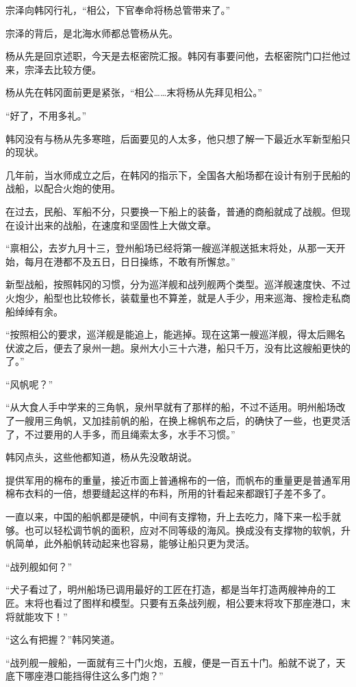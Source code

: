 宗泽向韩冈行礼，“相公，下官奉命将杨总管带来了。”

宗泽的背后，是北海水师都总管杨从先。

杨从先是回京述职，今天是去枢密院汇报。韩冈有事要问他，去枢密院门口拦他过来，宗泽去比较方便。

杨从先在韩冈面前更是紧张，“相公……末将杨从先拜见相公。”

“好了，不用多礼。”

韩冈没有与杨从先多寒暄，后面要见的人太多，他只想了解一下最近水军新型船只的现状。

几年前，当水师成立之后，在韩冈的指示下，全国各大船场都在设计有别于民船的战船，以配合火炮的使用。

在过去，民船、军船不分，只要换一下船上的装备，普通的商船就成了战舰。但现在设计出来的战船，在速度和坚固性上大做文章。

“禀相公，去岁九月十三，登州船场已经将第一艘巡洋舰送抵末将处，从那一天开始，每月在港都不及五日，日日操练，不敢有所懈怠。”

新型战船，按照韩冈的习惯，分为巡洋舰和战列舰两个类型。巡洋舰速度快、不过火炮少，船型也比较修长，装载量也不算差，就是人手少，用来巡海、搜检走私商船绰绰有余。

“按照相公的要求，巡洋舰是能追上，能逃掉。现在这第一艘巡洋舰，得太后赐名伏波之后，便去了泉州一趟。泉州大小三十六港，船只千万，没有比这艘船更快的了。”

“风帆呢？”

“从大食人手中学来的三角帆，泉州早就有了那样的船，不过不适用。明州船场改了一艘用三角帆，又加挂前帆的船，在换上棉帆布之后，的确快了一些，也更灵活了，不过要用的人手多，而且绳索太多，水手不习惯。”

韩冈点头，这些他都知道，杨从先没敢胡说。

提供军用的棉布的重量，接近市面上普通棉布的一倍，而帆布的重量更是普通军用棉布衣料的一倍，想要缝起这样的布料，所用的针看起来都跟钉子差不多了。

一直以来，中国的船帆都是硬帆，中间有支撑物，升上去吃力，降下来一松手就够。也可以轻松调节帆的面积，应对不同等级的海风。换成没有支撑物的软帆，升帆简单，此外船帆转动起来也容易，能够让船只更为灵活。

“战列舰如何？”

“犬子看过了，明州船场已调用最好的工匠在打造，都是当年打造两艘神舟的工匠。末将也看过了图样和模型。只要有五条战列舰，相公要末将攻下那座港口，末将就能攻下！”

“这么有把握？”韩冈笑道。

“战列舰一艘船，一面就有三十门火炮，五艘，便是一百五十门。船就不说了，天底下哪座港口能挡得住这么多门炮？”

